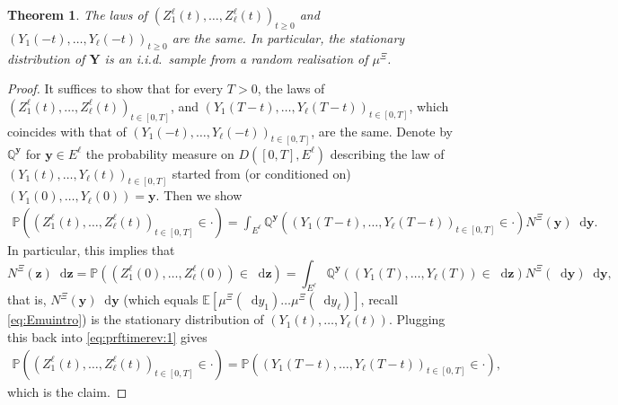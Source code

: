 \documentclass[reqno,draft]{amsart}
\numberwithin{equation}{section}
\theoremstyle{plain}
\newtheorem{theorem}{Theorem}[section]
\theoremstyle{remark}
\newcommand{\Q}{\mathbb{Q}} %
\renewcommand{\P}{\mathbb{P}} %
\newcommand{\E}{\mathbb{E}} %
\newcommand*\diff{\mathop{}\!\mathrm{d}}
\begin{document}
\begin{theorem}\label{thm:xifvreversal}
    The laws of $(Z^\ell_1(t), \ldots ,Z^\ell_\ell(t))_{t \ge 0}$ and $(Y_1(-t), \ldots ,Y_\ell(-t))_{t \ge 0}$ are the same. In particular, the stationary distribution of $\boldsymbol Y$ is an i.i.d.\ sample from a random realisation of $\mu^\Xi$.
\end{theorem}
\begin{proof}
    It suffices to show that for every $T > 0$, the laws of $(Z^\ell_1(t), \ldots ,Z^\ell_\ell(t))_{t\in [0,T]}$, and $(Y_1(T-t), \ldots ,Y_\ell(T-t))_{t \in [0,T]}$, which coincides with that of $(Y_1(-t), \ldots ,Y_\ell(-t))_{t\in [0,T]}$, are the same. Denote by $\Q^{\boldsymbol y}$ for $\boldsymbol y\in E^\ell$ the probability measure on $D([0,T],E^\ell)$ describing the law of $(Y_1(t), \ldots ,Y_\ell(t))_{t \in [0,T]}$ started from (or conditioned on) $(Y_1(0), \ldots ,Y_\ell(0)) = \boldsymbol y$. Then we show
    \begin{align}\label{eq:prftimerev:1}
        \P ((Z^\ell_1(t),\ldots ,Z^\ell_\ell(t))_{t\in [0,T]} \in \cdot ) = \int_{E^\ell} \Q^{\boldsymbol y}((Y_1(T-t), \ldots ,Y_\ell(T-t))_{t\in [0,T]} \in \cdot ) N^\Xi(\boldsymbol y) \diff \boldsymbol y.
    \end{align}
    In particular, this implies that \[
        N^\Xi(\boldsymbol z) \diff \boldsymbol z = \P((Z^\ell_1(0), \ldots ,Z^\ell_\ell(0)) \in \diff \boldsymbol z) = \int_{E^\ell} \Q^{\boldsymbol y}((Y_1(T), \ldots ,Y_\ell(T)) \in \diff \boldsymbol z) N^\Xi(\diff \boldsymbol y) \diff \boldsymbol y,
    \] that is, $N^\Xi(\boldsymbol y) \diff \boldsymbol y$ (which equals $\E \left[ \mu^\Xi(\diff y_1)\ldots \mu^\Xi(\diff y_\ell) \right] $, recall \cref{eq:Emuintro}) is the stationary distribution of $(Y_1(t), \ldots ,Y_\ell(t))$. Plugging this back into \cref{eq:prftimerev:1} gives
    \begin{align*}
        \P((Z^\ell_1(t), \ldots ,Z^\ell_\ell(t))_{t\in [0,T]} \in \cdot ) = \P((Y_1(T-t), \ldots ,Y_\ell(T-t))_{t\in [0,T]}\in \cdot ),
    \end{align*}
    which is the claim.


\end{proof}
\end{document}
